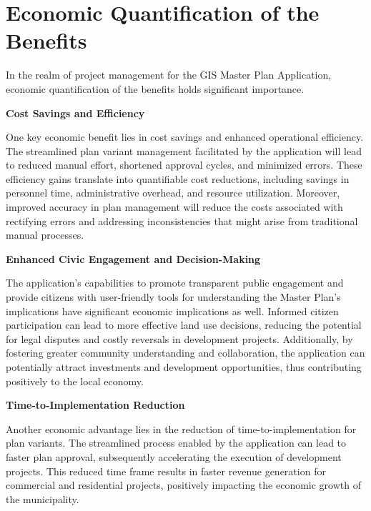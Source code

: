 \section{Economic Quantification of the Benefits}\label{sec:economic-quantification-of-the-benefits}
In the realm of project management for the GIS Master Plan Application, economic quantification of the benefits holds significant importance.
\linebreak

\textbf{Cost Savings and Efficiency}

One key economic benefit lies in cost savings and enhanced operational efficiency.
The streamlined plan variant management facilitated by the application will lead to reduced manual effort, shortened approval cycles, and minimized errors.
These efficiency gains translate into quantifiable cost reductions, including savings in personnel time, administrative overhead, and resource utilization.
Moreover, improved accuracy in plan management will reduce the costs associated with rectifying errors and addressing inconsistencies that might arise from traditional manual processes.
\linebreak

\textbf{Enhanced Civic Engagement and Decision-Making}

The application's capabilities to promote transparent public engagement and provide citizens with user-friendly tools for understanding the Master Plan's implications have significant economic implications as well.
Informed citizen participation can lead to more effective land use decisions, reducing the potential for legal disputes and costly reversals in development projects.
Additionally, by fostering greater community understanding and collaboration, the application can potentially attract investments and development opportunities, thus contributing positively to the local economy.
\linebreak

\textbf{Time-to-Implementation Reduction}

Another economic advantage lies in the reduction of time-to-implementation for plan variants.
The streamlined process enabled by the application can lead to faster plan approval, subsequently accelerating the execution of development projects.
This reduced time frame results in faster revenue generation for commercial and residential projects, positively impacting the economic growth of the municipality.
\linebreak

